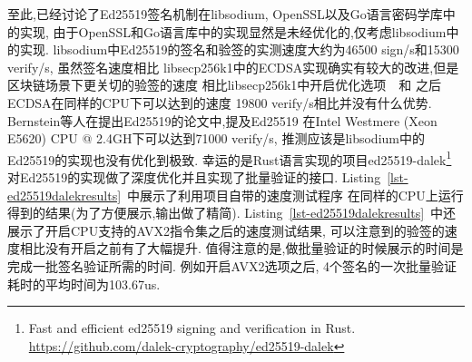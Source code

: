 至此,已经讨论了Ed25519签名机制在libsodium, OpenSSL以及Go语言密码学库中的实现,
由于OpenSSL和Go语言库中的实现显然是未经优化的,仅考虑libsodium中的实现.
libsodium中Ed25519的签名和验签的实测速度大约为46500 sign/s和15300 verify/s, 虽然签名速度相比
libsecp256k1中的ECDSA实现确实有较大的改进,但是区块链场景下更关切的验签的速度
相比libsecp256k1中开启优化选项~~和
之后ECDSA在同样的CPU下可以达到的速度
19800 verify/s相比并没有什么优势. Bernstein等人在提出Ed25519的论文中,提及Ed25519
在Intel Westmere (Xeon E5620) CPU @ 2.4GH下可以达到71000 verify/s,
推测应该是libsodium中的Ed25519的实现也没有优化到极致.
幸运的是Rust语言实现的项目ed25519-dalek\footnote{
Fast and efficient ed25519 signing and verification in Rust.
\url{https://github.com/dalek-cryptography/ed25519-dalek}}
对Ed25519的实现做了深度优化并且实现了批量验证的接口.
Listing~\ref{lst-ed25519dalekresults}~中展示了利用项目自带的速度测试程序
在同样的CPU上运行得到的结果(为了方便展示,输出做了精简).
Listing~\ref{lst-ed25519dalekresults}~中还展示了开启CPU支持的AVX2指令集之后的速度测试结果,
可以注意到的验签的速度相比没有开启之前有了大幅提升.
值得注意的是,做批量验证的时候展示的时间是完成一批签名验证所需的时间.
例如开启AVX2选项之后, 4个签名的一次批量验证耗时的平均时间为103.67us.


